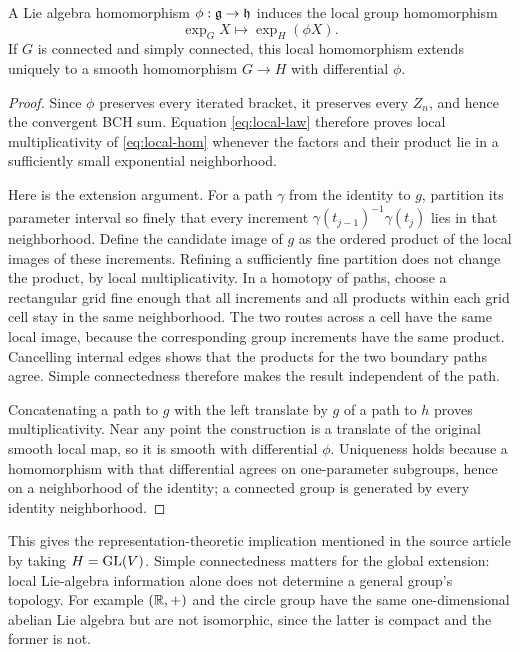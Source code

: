 \begin{proposition}\label{prop:integration}
A Lie algebra homomorphism $\phi:\mathfrak g\to\mathfrak h$ induces the local group homomorphism
\begin{equation}\label{eq:local-hom}
 \exp_GX\longmapsto\exp_H(\phi X).
\end{equation}
If $G$ is connected and simply connected, this local homomorphism extends uniquely to a smooth homomorphism $G\to H$ with differential $\phi$.
\end{proposition}
\begin{proof}
Since $\phi$ preserves every iterated bracket, it preserves every $Z_n$, and hence the convergent BCH sum. Equation \cref{eq:local-law} therefore proves local multiplicativity of \cref{eq:local-hom} whenever the factors and their product lie in a sufficiently small exponential neighborhood.

Here is the extension argument. For a path $\gamma$ from the identity to $g$, partition its parameter interval so finely that every increment
$\gamma(t_{j-1})^{-1}\gamma(t_j)$ lies in that neighborhood. Define the candidate image of $g$ as the ordered product of the local images of these increments. Refining a sufficiently fine partition does not change the product, by local multiplicativity. In a homotopy of paths, choose a rectangular grid fine enough that all increments and all products within each grid cell stay in the same neighborhood. The two routes across a cell have the same local image, because the corresponding group increments have the same product. Cancelling internal edges shows that the products for the two boundary paths agree. Simple connectedness therefore makes the result independent of the path.

Concatenating a path to $g$ with the left translate by $g$ of a path to $h$ proves multiplicativity. Near any point the construction is a translate of the original smooth local map, so it is smooth with differential $\phi$. Uniqueness holds because a homomorphism with that differential agrees on one-parameter subgroups, hence on a neighborhood of the identity; a connected group is generated by every identity neighborhood.
\end{proof}
This gives the representation-theoretic implication mentioned in the source article by taking $H=\operatorname{GL}(V)$. Simple connectedness matters for the global extension: local Lie-algebra information alone does not determine a general group's topology. For example $(\mathbb R,+)$ and the circle group have the same one-dimensional abelian Lie algebra but are not isomorphic, since the latter is compact and the former is not.

